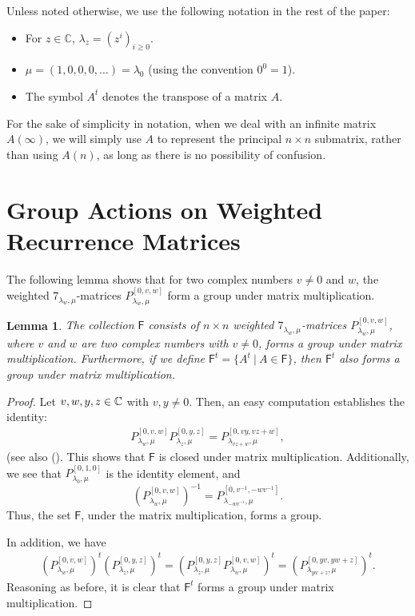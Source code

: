 \documentclass{amsart}
\newtheorem{lm}{Lemma}
\begin{document}
Unless noted otherwise, we use the following notation in the rest of the paper:
\begin{itemize}
\item For $z\in {\mathbb C}$, $\lambda_z=(z^i)_{i\geq 0}$.
\item $\mu=(1, 0, 0, 0, \ldots)=\lambda_0$ (using the convention $0^0=1$). 
\item The symbol $A^t$ denotes the transpose of a matrix $A$.
\end{itemize}
For the sake of simplicity in notation, when we deal with an infinite matrix $A(\infty)$, we will simply use $A$ to represent the principal $n \times n$ submatrix, rather than using $A(n)$, as long as there is no possibility of confusion. 
 




\section{Group Actions on Weighted  Recurrence Matrices} 
 The following lemma shows that for two complex numbers $v \neq 0$ and $w$, the weighted $7_{\lambda_w, \mu}$-matrices $P_{\lambda_w, \mu}^{[0, v, w]}$ form a group under matrix multiplication.
\begin{lm}\label{lm1} 
The collection $\mathsf {F}$ consists of $n\times n$ weighted  $7_{\lambda_w, \mu}$-matrices $P_{\lambda_w, \mu}^{[0, v, w]}$, where $v$ and $w$ are two complex numbers with $v\neq 0$, 
forms a group under matrix multiplication. Furthermore, if we define $\mathsf {F}^t=\{A^t \ | \ A\in \mathsf {F}\}$, then  $\mathsf {F}^t$ also forms a group under matrix multiplication.
\end{lm}
\begin{proof} Let $ v, w, y, z\in {\Bbb C}$ with $v, y\neq 0$. Then, an easy computation establishes the identity:
\begin{align}\label{eq-0} P_{\lambda_w, \mu}^{[0, v, w]}  P_{\lambda_z, \mu}^{[0, y, z]}=P_{\lambda_{vz+w}, \mu}^{[0, vy, vz+w]},\end{align}
(see also  (\cite[2.4]{T}). This shows that $\mathsf {F}$ is closed under matrix multiplication. Additionally, we see that $P_{\lambda_{0}, \mu}^{[0, 1, 0]}$ is the identity element,  and 
\[(P_{\lambda_w, \mu}^{[0, v, w]})^{-1}=P_{\lambda_{-wv^{-1}}, \mu}^{[0, v^{-1}, -wv^{-1}]}.\]
Thus, the set $\mathsf {F}$, under the matrix multiplication, forms a group. 

In addition, we have 
\begin{align*} (P_{\lambda_w, \mu}^{[0, v, w]})^t  (P_{\lambda_z, \mu}^{[0, y, z]})^t=(P_{\lambda_z, \mu}^{[0, y, z]}P_{\lambda_w, \mu}^{[0, v, w]} )^t=(P_{\lambda_{yw+z}, \mu}^{[0, yv, yw+z]})^t.\end{align*}
Reasoning as before, it is clear that $\mathsf {F}^t$ forms a group under matrix multiplication. 
\end{proof}
\end{document}
